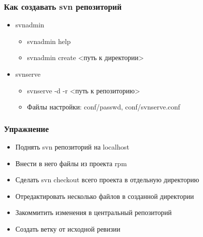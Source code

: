 \begin{frame}
 \frametitle{Как создавать svn репозиторий}
 \begin{itemize}
   \item svnadmin
     \begin{itemize}
       \item svnadmin help
       \item svnadmin create <путь к директории>
     \end{itemize}
    \item svnserve
      \begin{itemize}
        \item svnserve -d -r <путь к репозиторию>
        \item Файлы настройки: conf/passwd, conf/svnserve.conf
      \end{itemize}
  \end{itemize}
\end{frame}

\begin{frame}
 \frametitle{Упражнение}
  \begin{itemize}
    \item Поднять svn репозиторий на localhost
    \item Внести в него файлы из проекта rpm
    \item Сделать svn checkout всего проекта в отдельную директорию
    \item Отредактировать несколько файлов в созданной директории
    \item Закоммитить изменения в центральный репозиторий
    \item Создать ветку от исходной ревизии
  \end{itemize}
\end{frame}
